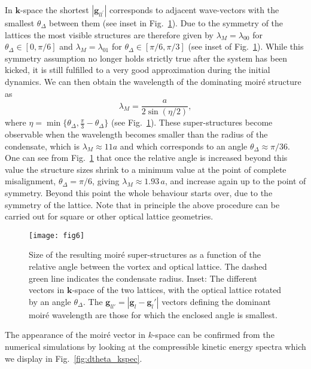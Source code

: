     In $\mathbf{k}$-space the shortest $|\mathbf{g}_{ll^\prime}|$ corresponds to adjacent wave-vectors with the smallest $\theta_\Delta$ between them (see inset in Fig.~\ref{fig:moire_lambda_1}). Due to the symmetry of the lattices the most visible structures are therefore given by $\lambda_M=\lambda_{00}$ for $\theta_\Delta\in[0,\pi/6]$ and $\lambda_M=\lambda_{01}$ for $\theta_\Delta\in[\pi/6,\pi/3]$ (see inset of Fig.~\ref{fig:moire_lambda_1}).
    While this symmetry assumption no longer holds strictly true after the system has been kicked, it is still fulfilled to a very good approximation during the initial dynamics. We can then
    	obtain the wavelength of the dominating moir\'e structure as~\cite{jns-moire,nphys2272}
    		\begin{equation}
    		\lambda_M = \frac{a}{2\sin(\eta/2)},
    		\label{eqn:moire_size}
    	\end{equation}
    where $\eta=\min\{\theta_\Delta,\frac{\pi}{3} - \theta_\Delta \} $  (see Fig.~\ref{fig:moire_lambda_1}).
    	These super-structures
    	become observable when the wavelength becomes smaller than the radius of the condensate, which is $\lambda_M \approx 11a$
    	and which corresponds to an angle $\theta_\Delta \approx \pi/36$.
    	 One can see from Fig.~\ref{fig:moire_lambda_1} that once the relative angle is increased beyond this value
    	the structure sizes shrink to a minimum value at the point of complete misalignment, $\theta_\Delta=\pi/6$, giving $\lambda_M\approx 1.93\,a$, and increase again up to the point of symmetry. Beyond this point the whole behaviour starts over, due to the symmetry of the lattice.
    Note that in principle the above procedure can be carried out for square or other optical lattice geometries.

    	\begin{figure}[tb]
    		\texttt{[image: fig6]}
    		\caption{Size of the resulting moir\'e super-structures as a function of the relative angle between the vortex and optical lattice. The dashed green line indicates the condensate radius. Inset: The different vectors in $\mathbf{k}$-space of the two lattices, with the optical lattice rotated by an angle $\theta_\Delta$. The $\mathbf{g}_{ll'} = |\mathbf{g}_l - \mathbf{g}_l'|$ vectors defining the dominant moir\'e wavelength are those for which the enclosed angle is smallest. }
    		\label{fig:moire_lambda_1}
    	\end{figure}

    The appearance of the moir\'e vector in $k$-space can be confirmed from the numerical simulations by looking at the compressible kinetic energy spectra which we display in Fig.~\ref{fig:dtheta_kspec}.

